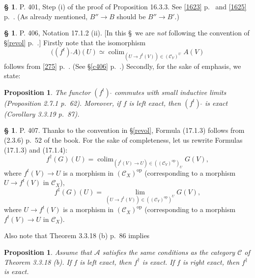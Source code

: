 \documentclass[12pt]{article}
\newtheorem{prop}[thm]{Proposition}
\theoremstyle{remark}
\theoremstyle{definition}
\newtheorem{s}[thm]{\S}
\newcommand{\A}{\mathcal A}
\newcommand{\C}{\mathcal C}
\DeclareMathOperator*{\co}{colim}
\DeclareMathOperator{\op}{op}
\DeclareMathOperator{\PSh}{PSh}
\begin{document}
%
%
\begin{s} P. 401, Step (i) of the proof of Proposition 16.3.3. See \eqref{1623} p.~\pageref{1623} and \eqref{1625} p.~\pageref{1625}. (As already mentioned, $B''\to B$ should be $B''\to B'$.)
\end{s}
%
%
\begin{s} P. 406, Notation 17.1.2 (ii). [In this \S\ we are {\em not} following the convention of \S\ref{revol} p.~\pageref{revol}.] Firstly note that the isomorphism 
$$
\big((f^t)\ \widehat{}A\big)(U)\simeq\co_{(U\to f^t(V))\in(\C_Y)^U}A(V)
$$
follows from \eqref{275} p.~\pageref{275}. (See \S\ref{c406} p.~\pageref{c406}.) Secondly, for the sake of emphasis, we state: 
%
\begin{prop}\label{p406}
The functor $(f^t)\ \widehat{}$ commutes with small inductive limits (Proposition 2.7.1 p.~62). Moreover, if $f$ is left exact, then $(f^t)\ \widehat{}$ is exact (Corollary 3.3.19 p.~87).
\end{prop}
\end{s}
%
%
\begin{s}\label{revol2} P. 407. Thanks to the convention in \S\ref{revol}, Formula (17.1.3) follows from (2.3.6) p.~52 of the book. For the sake of completeness, let us rewrite Formulas (17.1.3) and (17.1.4):
\begin{equation}\label{17.1.3}
f^\dagger(G)(U)=\co_{(f^t(V)\to U)\in((\C_Y)^{\op})_U}G(V),
\end{equation} 
where $f^t(V)\to U$ is a morphism in $(\C_X)^{\op}$ (corresponding to a morphism $U\to f^t(V)$ in $\C_X$),
\begin{equation}\label{17.1.4}
f^\ddagger(G)(U)=\lim_{(U\to f^t(V))\in((\C_Y)^{\op})^U}G(V),
\end{equation} 
where $U\to f^t(V)$ is a morphism in $(\C_X)^{\op}$ (corresponding to a morphism $f^t(V)\to U$ in $\C_X$).
%
\begin{comment}

Instead of:

One has the functors 
$$
f^t{}_*:\PSh(X,\A)\to\PSh(Y,\A),
$$
$$
f^t{}^\dagger:\PSh(X,\A)\to\PSh(Y,\A),
$$
$$
f^t{}^\ddagger:\PSh(X,\A)\to\PSh(Y,\A).
$$ 
it would be better (I think) to write:

One has the functors 
$$
f^{t\op}{}_*:\PSh(X,\A)\to\PSh(Y,\A),
$$
$$
f^{t\op}{}^\dagger:\PSh(X,\A)\to\PSh(Y,\A),
$$
$$
f^{t\op}{}^\ddagger:\PSh(X,\A)\to\PSh(Y,\A).
$$ 

We write for short 
$$
f_*:=f^{t\op}{}_*,\quad f^\dagger:=f^{t\op}{}^\dagger,\quad f^\ddagger:=f^{t\op}{}^\ddagger.
$$
%
\end{comment}
%
Also note that Theorem 3.3.18 (b) p.~86 implies 
%
\begin{prop}\label{407}
Assume that $\A$ satisfies the same conditions as the category $\C$ of Theorem 3.3.18 (b). If $f$ is left exact, then $f^\dagger$ is exact. If $f$ is right exact, then $f^\ddagger$ is exact. 
\end{prop}
\end{s}
\end{document}
